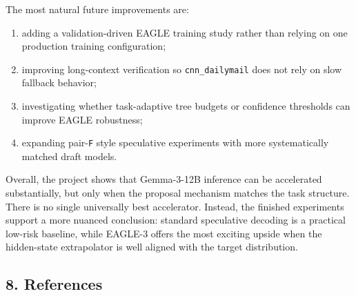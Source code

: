 \documentclass[
]{article}
\begin{document}
The most natural future improvements are:

\begin{enumerate}
\def\labelenumi{\arabic{enumi}.}
\item
  adding a validation-driven EAGLE training study rather than relying on
  one production training configuration;
\item
  improving long-context verification so \texttt{cnn\_dailymail} does
  not rely on slow fallback behavior;
\item
  investigating whether task-adaptive tree budgets or confidence
  thresholds can improve EAGLE robustness;
\item
  expanding pair-\texttt{F} style speculative experiments with more
  systematically matched draft models.
\end{enumerate}

Overall, the project shows that Gemma-3-12B inference can be accelerated
substantially, but only when the proposal mechanism matches the task
structure. There is no single universally best accelerator. Instead, the
finished experiments support a more nuanced conclusion: standard
speculative decoding is a practical low-risk baseline, while EAGLE-3
offers the most exciting upside when the hidden-state extrapolator is
well aligned with the target distribution.

\subsection{8. References}\label{8-references}
\end{document}
